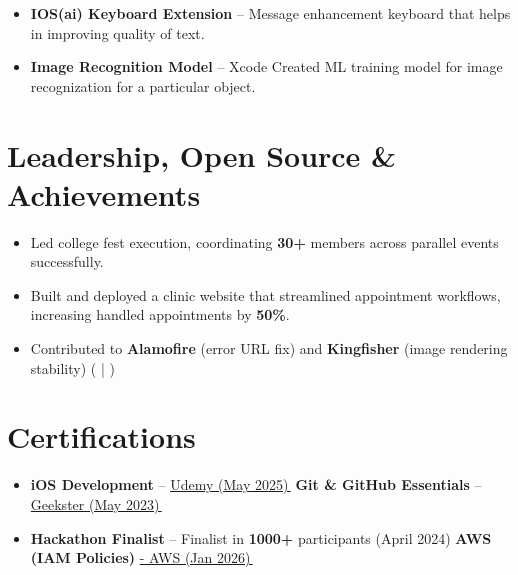 \documentclass[a4paper,12pt]{article}
\begin{document}
\begin{itemize}
\item \textbf{IOS(ai) Keyboard Extension} – Message enhancement keyboard that helps in improving quality of text.

\item \textbf{Image Recognition Model} – Xcode Created ML training 
model for image recognization for a particular object.

\end{itemize}

\section*{Leadership, Open Source \& Achievements}
\small
\begin{itemize}
\item Led college fest execution, coordinating \textbf{30+} members across parallel events successfully.

\item Built and deployed a clinic website that streamlined appointment workflows, increasing handled appointments by \textbf{50\%}.

\item Contributed to \textbf{Alamofire} (error URL fix) and \textbf{Kingfisher} (image rendering stability)
(\href{https://github.com/Alamofire/Alamofire/pull/3993#issue-3664806169}{\scriptsize\underline{\faGithub}} |
\href{https://github.com/onevcat/Kingfisher/pull/2449#issue-3668220120}{\scriptsize\underline{\faGithub}})
\end{itemize}

\section*{Certifications}
\small
\begin{itemize}
\item \textbf{iOS Development} –
\href{https://drive.google.com/file/d/1NkIydYbL0cxcTVNwaO07_AIsifqrFCbU/view?usp=sharing}
{Udemy (May 2025)\,{\scriptsize\faExternalLink*}}
\hfill
\textbf{Git \& GitHub Essentials} –
\href{https://drive.google.com/file/d/1A49MSBFKe2o2dc0MWRuGi9G-4fPWzWsD/view?usp=sharing}
{Geekster (May 2023)\,{\scriptsize\faExternalLink*}}


\item \textbf{Hackathon Finalist} – Finalist in \textbf{1000+} participants (April 2024)
\hfill
\textbf{AWS (IAM Policies)}
\href{https://drive.google.com/file/d/ /view?usp=sharing}
{- AWS (Jan 2026)\,{\scriptsize\faExternalLink*}}
\end{itemize}
\end{document}
